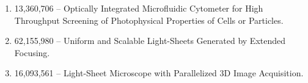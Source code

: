 \begin{enumerate}
\item 13,360,706 -- Optically Integrated Microfluidic Cytometer for High Throughput Screening of Photophysical Properties of Cells or Particles.  
\item 62,155,980 -- Uniform and Scalable Light-Sheets Generated by Extended Focusing.  
\item 16,093,561 -- Light-Sheet Microscope with Parallelized 3D Image Acquisition. 
\end{enumerate}